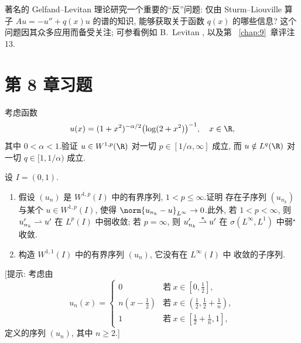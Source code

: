著名的 Gelfand--Levitan 理论研究一个重要的``反''问题: 仅由 Sturm--Liouville
算子 $Au=-u''+q(x)u$ 的谱的知识, 能够获取关于函数 $q(x)$ 的哪些信息?
这个问题因其众多应用而备受关注; 可参看例如 B.~Levitan ,
以及第~
\ref{chap:9}~章评注 13.

\section*{第 8 章习题}

\begin{exercise}
\label{exer:8.1}
考虑函数
\begin{equation*}
u(x)=(1+x^2)^{-\alpha/2}\bigl(\log(2+x^2)\bigr)^{-1},\quad x\in\R,
\end{equation*}
其中 $0<\alpha<1$.验证 $u\in W^{1,p}(\R)$ 对一切 $p\in[1/\alpha,\infty]$
成立, 而 $u\notin L^q(\R)$ 对一切 $q\in[1,1/\alpha)$ 成立.
\end{exercise}

\begin{exercise}
\label{exer:8.2}
设 $I=(0,1)$.
\begin{enumerate}[label=\arabic*., leftmargin=2.2em, itemsep=0.3em]
	\item 假设 $(u_n)$ 是 $W^{1,p}(I)$ 中的有界序列, $1<p\le\infty$.证明
	      存在子序列 $(u_{n_k})$ 与某个 $u\in W^{1,p}(I)$, 使得
	      $\norm{u_{n_k}-u}_{L^\infty}\to0$.此外, 若 $1<p<\infty$, 则
	      $u_{n_k}'\rightharpoonup u'$ 在 $L^p(I)$ 中弱收敛; 若 $p=\infty$, 则
	      $u_{n_k}'\overset{*}{\rightharpoonup} u'$ 在 $\sigma(L^\infty,L^1)$ 中弱$^\star$收敛.
	\item 构造 $W^{1,1}(I)$ 中的有界序列 $(u_n)$, 它没有在 $L^\infty(I)$ 中
	      收敛的子序列.
\end{enumerate}
[提示: 考虑由
\begin{equation*}
u_n(x)=
\begin{cases}
0 & \text{若}\ x\in[0,\tfrac12],\\
n(x-\tfrac12) & \text{若}\ x\in(\tfrac12,\tfrac12+\tfrac1n),\\
1 & \text{若}\ x\in[\tfrac12+\tfrac1n,1],
\end{cases}
\end{equation*}
定义的序列 $(u_n)$, 其中 $n\ge2$.]
\end{exercise}

